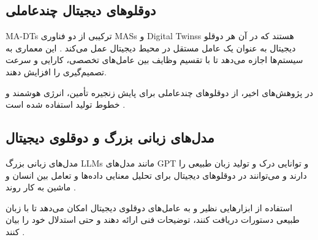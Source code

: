 \subsection{دوقلوهای دیجیتال چندعاملی}


\glspl{MA-DT}
ترکیبی از دو فناوری \glspl{MAS} و \glspl{Digital Twins} هستند که در آن هر دوقلو دیجیتال به عنوان یک عامل مستقل در محیط دیجیتال عمل می‌کند \cite{pretel2022masdt,wang2024multiagent}. این معماری به سیستم‌ها اجازه می‌دهد تا با تقسیم وظایف بین عامل‌های تخصصی، کارایی و سرعت تصمیم‌گیری را افزایش دهند. 


در پژوهش‌های اخیر، از دوقلوهای چندعاملی برای پایش زنجیره تأمین، انرژی هوشمند و خطوط تولید استفاده شده است \cite{liu2024ai}. 


\subsection{مدل‌های زبانی بزرگ و دوقلوی دیجیتال}

مدل‌های زبانی بزرگ 
\glspl{LLM}
 مانند مدل‌های 
 \gls{GPT}
 و 
  توانایی درک و تولید زبان طبیعی را دارند و می‌توانند در دوقلوهای دیجیتال برای تحلیل معنایی داده‌ها و تعامل بین انسان و ماشین به کار روند \cite{Pizon2026integrating,liu2025empoweringdt}. 



استفاده از ابزارهایی نظیر 
 و 
  به عامل‌های دوقلوی دیجیتال امکان می‌دهد تا با زبان طبیعی دستورات دریافت کنند، توضیحات فنی ارائه دهند و حتی استدلال خود را بیان کنند \cite{park2025interactive}.

